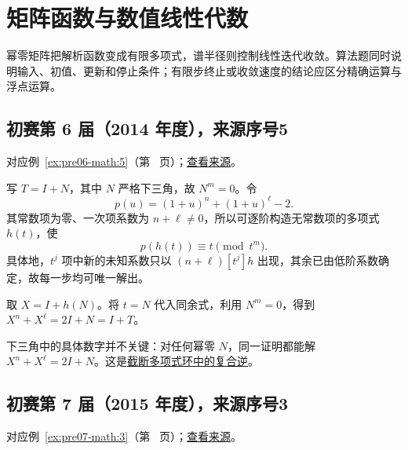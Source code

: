 \documentclass[12pt,fontset=fandol]{ctexart}
\begin{document}
\section{矩阵函数与数值线性代数}

\label{sec:solutions-10}

幂零矩阵把解析函数变成有限多项式，谱半径则控制线性迭代收敛。算法题同时说明输入、初值、更新和停止条件；有限步终止或收敛速度的结论应区分精确运算与浮点运算。

\subsection{初赛第 6 届（2014 年度），来源序号5}\label{ans:pre06-math:5}\label{pr:pre06-math:5}

对应例~\ref{ex:pre06-math:5}（第~\pageref{ex:pre06-math:5} 页）；\href{https://github.com/lzxcr/cmc-mathematics/blob/64916fa1fdbc3e444a652eca204d5669058ee321/src/problems/preliminary/06/05.md}{查看来源}。

\begin{solve}

写 $T=I+N$，其中 $N$ 严格下三角，故 $N^m=0$。令
\[
p(u)=(1+u)^n+(1+u)^\ell-2.
\]
其常数项为零、一次项系数为 $n+\ell\ne0$，所以可逐阶构造无常数项的多项式 $h(t)$，使
\[
p(h(t))\equiv t\pmod{t^m}.
\]
具体地，$t^j$ 项中新的未知系数只以 $(n+\ell)[t^j]h$ 出现，其余已由低阶系数确定，故每一步均可唯一解出。

取 $X=I+h(N)$。将 $t=N$ 代入同余式，利用 $N^m=0$，得到 $X^n+X^\ell=2I+N=I+T$。

\end{solve}

\begin{remark}[方法与条件]

下三角中的具体数字并不关键：对任何幂零 $N$，同一证明都能解 $X^n+X^\ell=2I+N$。这是\hyperref[app:algebra-interpolation]{截断多项式环中的复合逆}。

\end{remark}

\subsection{初赛第 7 届（2015 年度），来源序号3}\label{ans:pre07-math:3}\label{pr:pre07-math:3}

对应例~\ref{ex:pre07-math:3}（第~\pageref{ex:pre07-math:3} 页）；\href{https://github.com/lzxcr/cmc-mathematics/blob/64916fa1fdbc3e444a652eca204d5669058ee321/src/problems/preliminary/07/03.md}{查看来源}。
\end{document}
